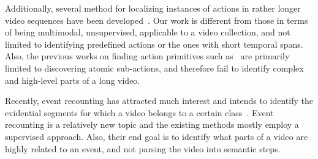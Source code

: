 Additionally, several method for localizing instances of actions in rather longer video sequences have been developed~\cite{duchenne09_iccv, hoai11_cvpr, laptev07_iccv, bojanowski14_eccv, pirsiavash14_cvpr}. Our work is different from those in terms of being multimodal, unsupervised, applicable to a video collection, and not limited to identifying predefined actions or the ones with short temporal spans.
Also, the previous works on finding action primitives such as~\cite{niebles10_eccv, yao10b_cvpr, jain13_cvpr,lan14_eccv, lan14_vs} are primarily limited to discovering atomic sub-actions, and therefore fail to identify complex and high-level parts of a long video.

Recently, event recounting has attracted much interest and intends to identify the evidential segments for which a video belongs to a certain class~\cite{sun2014discover,das2013thousand,barbu2012video}. Event recounting is a relatively new topic and the existing methods mostly employ a supervised approach. Also, their end goal is to identify what parts of a video are highly related to an event, and not parsing the video into semantic steps. 

